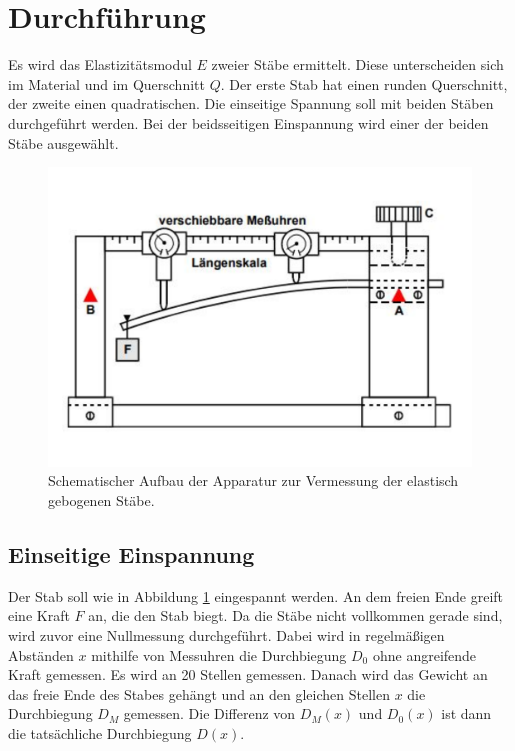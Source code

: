 \section{Durchführung}
\label{sec:Durchführung}
Es wird das Elastizitätsmodul $E$ zweier Stäbe ermittelt.
Diese unterscheiden sich im Material und im Querschnitt $Q$.
Der erste Stab hat einen runden Querschnitt, der zweite einen quadratischen.
Die einseitige Spannung soll mit beiden Stäben durchgeführt werden.
Bei der beidsseitigen Einspannung wird einer der beiden Stäbe ausgewählt.
\begin{figure}
    \centering
    \includegraphics[width=\textwidth]{Messapparat.pdf}
    \caption{Schematischer Aufbau der Apparatur zur Vermessung der elastisch gebogenen Stäbe. \cite{anleitung}}
    \label{fig:Messapparat}
\end{figure}
\subsection{Einseitige Einspannung}
\label{subsec:einseitigeEinspannung}
Der Stab soll wie in Abbildung \ref{fig:Messapparat} eingespannt werden.
An dem freien Ende greift eine Kraft $F$ an, die den Stab biegt.
Da die Stäbe nicht vollkommen gerade sind, wird zuvor eine Nullmessung durchgeführt.
Dabei wird in regelmäßigen Abständen $x$ mithilfe von Messuhren die Durchbiegung $D_0$ ohne angreifende Kraft gemessen.
Es wird an 20 Stellen gemessen.
Danach wird das Gewicht an das freie Ende des Stabes gehängt und an den gleichen Stellen $x$ die Durchbiegung $D_M$ gemessen.
Die Differenz von $D_M(x)$ und $D_0(x)$ ist dann die tatsächliche Durchbiegung $D(x)$.

